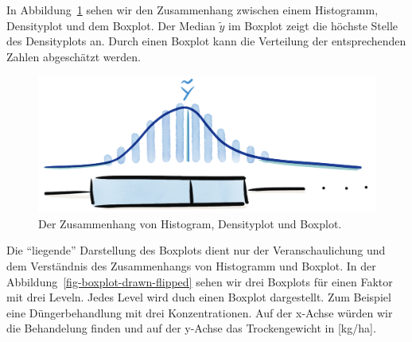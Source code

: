 \documentclass[
  letterpaper,
]{scrbook}
\begin{document}
In Abbildung~\ref{fig-boxplot-drawn-distribution} sehen wir den
Zusammenhang zwischen einem Histogramm, Densityplot und dem Boxplot. Der
Median \(\tilde{y}\) im Boxplot zeigt die höchste Stelle des
Densityplots an. Durch einen Boxplot kann die Verteilung der
entsprechenden Zahlen abgeschätzt werden.

\begin{figure}

{\centering \includegraphics[width=1\textwidth,height=\textheight]{./images/boxplot-drawn-distribution.png}

}

\caption{\label{fig-boxplot-drawn-distribution}Der Zusammenhang von
Histogram, Densityplot und Boxplot.}

\end{figure}

Die ``liegende'' Darstellung des Boxplots dient nur der
Veranschaulichung und dem Verständnis des Zusammenhangs von Histogramm
und Boxplot. In der Abbildung~\ref{fig-boxplot-drawn-flipped} sehen wir
drei Boxplots für einen Faktor mit drei Leveln. Jedes Level wird duch
einen Boxplot dargestellt. Zum Beispiel eine Düngerbehandlung mit drei
Konzentrationen. Auf der x-Achse würden wir die Behandelung finden und
auf der y-Achse das Trockengewicht in {[}kg/ha{]}.
\end{document}
